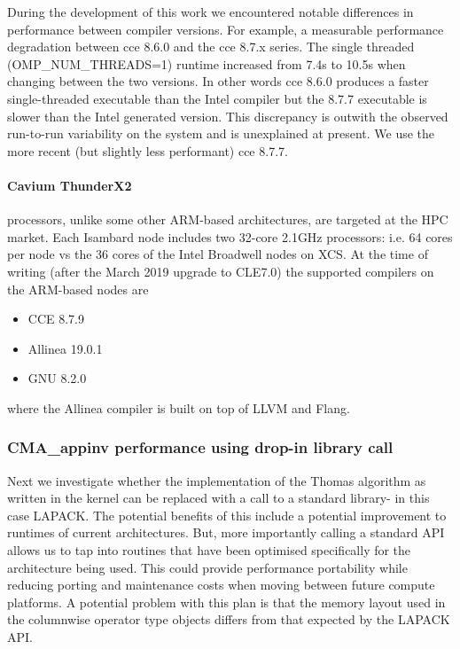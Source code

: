 During the development of this work we encountered notable differences in performance between compiler versions.
For example, a measurable performance degradation between cce 8.6.0 and the cce 8.7.x series.
The single threaded (OMP\_NUM\_THREADS=1) runtime increased from 7.4s to 10.5s when changing between the two versions.
In other words cce 8.6.0 produces a faster single-threaded executable than the Intel compiler but the 8.7.7 executable is slower than the Intel generated version.
This discrepancy is outwith the observed run-to-run variability on the system and is unexplained at present.
We use the more recent (but slightly less performant) cce 8.7.7.

\paragraph{Cavium ThunderX2} processors, unlike some other ARM-based architectures, are targeted at the HPC market.
Each Isambard node includes two 32-core 2.1GHz processors: i.e. 64 cores per node vs the 36 cores of the Intel Broadwell nodes on XCS.
At the time of writing (after the March 2019 upgrade to CLE7.0) the supported compilers on the ARM-based nodes are
\begin{itemize}
\item CCE 8.7.9
\item Allinea 19.0.1
\item GNU 8.2.0
\end{itemize}
where the Allinea compiler is built on top of LLVM and Flang.



\subsubsection{CMA\_appinv performance using drop-in library call}
Next we investigate whether the implementation of the Thomas algorithm as written in the kernel can be replaced with a call to a standard library- in this case LAPACK.
The potential benefits of this include a potential improvement to runtimes of current architectures.
But, more importantly calling a standard API allows us to tap into routines that have been optimised specifically for the architecture being used.
This could provide performance portability while reducing porting and maintenance costs when moving between future compute platforms.
A potential problem with this plan is that the memory layout used in the columnwise operator type objects differs from that expected by the LAPACK API.

